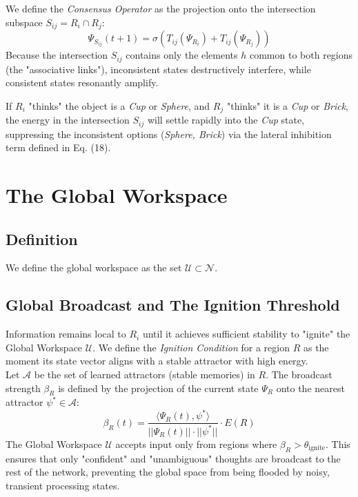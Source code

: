 \documentclass[twocolumn, 10pt]{article}
\begin{document}
We define the \textit{Consensus Operator} as the projection onto the intersection subspace $S_{ij} = R_i \cap R_j$:
\begin{equation}
    \Psi_{S_{ij}}(t+1) = \sigma \left( T_{ij}(\Psi_{R_i}) + T_{ij}(\Psi_{R_j}) \right)
\end{equation}
Because the intersection $S_{ij}$ contains only the elements $h$ common to both regions (the "associative links"), inconsistent states destructively interfere, while consistent states resonantly amplify.

If $R_i$ "thinks" the object is a \textit{Cup} or \textit{Sphere}, and $R_j$ "thinks" it is a \textit{Cup} or \textit{Brick}, the energy in the intersection $S_{ij}$ will settle rapidly into the \textit{Cup} state, suppressing the inconsistent options (\textit{Sphere, Brick}) via the lateral inhibition term defined in Eq. (18).




\section{The Global Workspace}
\subsection{Definition}
We define the global workspace as the set $\mathcal{U} \subset \mathcal{N}$.

\subsection{Global Broadcast and The Ignition Threshold}
Information remains local to $R_i$ until it achieves sufficient stability to "ignite" the Global Workspace $\mathcal{U}$. We define the \textit{Ignition Condition} for a region $R$ as the moment its state vector aligns with a stable attractor with high energy. \\

Let $\mathcal{A}$ be the set of learned attractors (stable memories) in $R$. The broadcast strength $\beta_R$ is defined by the projection of the current state $\Psi_R$ onto the nearest attractor $\psi^* \in \mathcal{A}$:
\begin{equation}
    \beta_R(t) = \frac{\langle \Psi_R(t), \psi^* \rangle}{||\Psi_R(t)|| \cdot ||\psi^*||} \cdot E(R)
\end{equation}
The Global Workspace $\mathcal{U}$ accepts input only from regions where $\beta_R > \theta_{\text{ignite}}$. This ensures that only "confident" and "unambiguous" thoughts are broadcast to the rest of the network, preventing the global space from being flooded by noisy, transient processing states.
\end{document}
